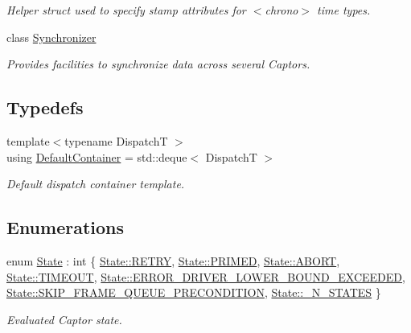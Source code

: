 \begin{DoxyCompactItemize}
\begin{DoxyCompactList}\small\item\em Helper struct used to specify stamp attributes for $<$chrono$>$ time types. \end{DoxyCompactList}\item 
class \hyperlink{classflow_1_1_synchronizer}{Synchronizer}
\begin{DoxyCompactList}\small\item\em Provides facilities to synchronize data across several Captors. \end{DoxyCompactList}\end{DoxyCompactItemize}
\subsection*{Typedefs}
\begin{DoxyCompactItemize}
\item 
\mbox{\label{namespaceflow_ae5be95d6aaac2a27a1504e60657ad00d}} 
{\footnotesize template$<$typename DispatchT $>$ }\\using \hyperlink{namespaceflow_ae5be95d6aaac2a27a1504e60657ad00d}{Default\+Container} = std\+::deque$<$ DispatchT $>$
\begin{DoxyCompactList}\small\item\em Default dispatch container template. \end{DoxyCompactList}\end{DoxyCompactItemize}
\subsection*{Enumerations}
\begin{DoxyCompactItemize}
\item 
enum \hyperlink{namespaceflow_adefe9726e597eb50c46f0f6a202018e9}{State} \+: int \{ \newline
\hyperlink{namespaceflow_adefe9726e597eb50c46f0f6a202018e9ac0cc02c3b3d55abb7bfb49ddbb4866c8}{State\+::\+R\+E\+T\+RY}, 
\hyperlink{namespaceflow_adefe9726e597eb50c46f0f6a202018e9a6eed4968877959d0209d9b75fdd16b52}{State\+::\+P\+R\+I\+M\+ED}, 
\hyperlink{namespaceflow_adefe9726e597eb50c46f0f6a202018e9a8d12a2ca7e5a64036d7251a3eda51a38}{State\+::\+A\+B\+O\+RT}, 
\hyperlink{namespaceflow_adefe9726e597eb50c46f0f6a202018e9a070a0fb40f6c308ab544b227660aadff}{State\+::\+T\+I\+M\+E\+O\+UT}, 
\newline
\hyperlink{namespaceflow_adefe9726e597eb50c46f0f6a202018e9a5fb9cb06b1db824c6527795c8d73925d}{State\+::\+E\+R\+R\+O\+R\+\_\+\+D\+R\+I\+V\+E\+R\+\_\+\+L\+O\+W\+E\+R\+\_\+\+B\+O\+U\+N\+D\+\_\+\+E\+X\+C\+E\+E\+D\+ED}, 
\hyperlink{namespaceflow_adefe9726e597eb50c46f0f6a202018e9a553bb3189571a5b09c1d53c315abd8f8}{State\+::\+S\+K\+I\+P\+\_\+\+F\+R\+A\+M\+E\+\_\+\+Q\+U\+E\+U\+E\+\_\+\+P\+R\+E\+C\+O\+N\+D\+I\+T\+I\+ON}, 
\hyperlink{namespaceflow_adefe9726e597eb50c46f0f6a202018e9a63b87258ef5b5f3ccdfd68f9e673d66d}{State\+::\+\_\+\+N\+\_\+\+S\+T\+A\+T\+ES}
 \}\begin{DoxyCompactList}\small\item\em Evaluated Captor state. \end{DoxyCompactList}
\end{DoxyCompactItemize}

